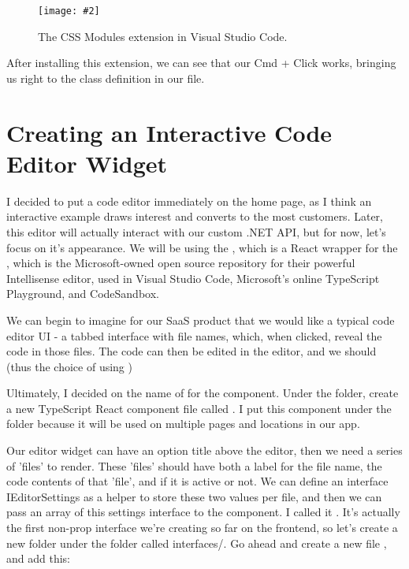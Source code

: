 \documentclass[a4paper,headinclude=on,footinclude=on,12pt,oneside]{scrbook}
\makeatletter
\newcommand{\standardfigure}[3]{\begin{figure}[H]\begin{center}\texttt{[image: \#2]}\caption{#3}\label{fig:#2}\end{center}\end{figure}}
\newcommand{\at}{\makeatletter @\makeatother}
\makeatother
\begin{document}
\standardfigure{\textwidth}{/frontend/css-modules-extension}{The CSS Modules extension in Visual Studio Code.}

After installing this extension, we can see that our Cmd + Click works, bringing us right to the class definition in our file.

\section{Creating an Interactive Code Editor Widget}

I decided to put a code editor immediately on the home page, as I think an interactive example draws interest and converts to the most customers. Later, this editor will actually interact with our custom .NET API, but for now, let's focus on it's appearance. We will be using the \codeword{\at monaco-editor/react}, which is a React wrapper for the , which is the Microsoft-owned open source repository for their powerful Intellisense editor, used in Visual Studio Code, Microsoft's online TypeScript Playground, and CodeSandbox. 


We can begin to imagine for our SaaS product that we would like a typical code editor UI - a tabbed interface with file names, which, when clicked, reveal the code in those files. The code can then be edited in the editor, and we should (thus the choice of using )


Ultimately, I decided on the name of  for the component. Under the  folder, create a new TypeScript React component file called . I put this component under the  folder because it will be used on multiple pages and locations in our app.


Our editor widget can have an option title above the editor, then we need a series of 'files' to render. These 'files' should have both a label for the file name, the code contents of that 'file', and if it is active or not. We can define an interface IEditorSettings as a helper to store these two values per file, and then we can pass an array of this settings interface to the  component. I called it . It's actually the first non-prop interface we're creating so far on the frontend, so let's create a new folder under the  folder called {interfaces/}. Go ahead and create a new file , and add this:
\end{document}
